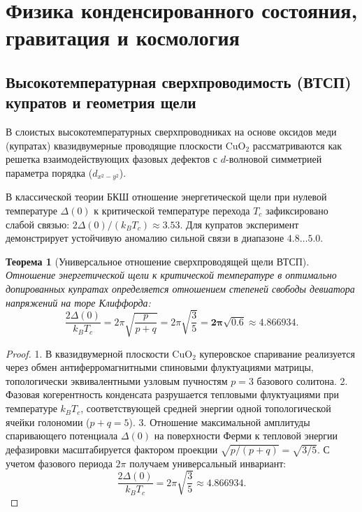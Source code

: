 \documentclass[11pt,a4paper]{article}
\newtheorem{theorem}{Теорема}[section]
\theoremstyle{definition}
\theoremstyle{remark}
\begin{document}

\section{Физика конденсированного состояния, гравитация и космология}
\label{sec:condensed_cosmo}

\subsection{Высокотемпературная сверхпроводимость (ВТСП) купратов и геометрия щели}
В слоистых высокотемпературных сверхпроводниках на основе оксидов меди (купратах) квазидвумерные проводящие плоскости $\mathrm{CuO}_2$ рассматриваются как решетка взаимодействующих фазовых дефектов с $d$-волновой симметрией параметра порядка ($d_{x^2 - y^2}$).

В классической теории БКШ отношение энергетической щели при нулевой температуре $\Delta(0)$ к критической температуре перехода $T_c$ зафиксировано слабой связью: $2\Delta(0)/(k_B T_c) \approx 3.53$. Для купратов эксперимент демонстрирует устойчивую аномалию сильной связи в диапазоне $4.8\dots 5.0$.

\begin{theorem}[Универсальное отношение сверхпроводящей щели ВТСП]
Отношение энергетической щели к критической температуре в оптимально допированных купратах определяется отношением степеней свободы девиатора напряжений на торе Клиффорда:
\begin{equation}
    \frac{2\Delta(0)}{k_B T_c} = 2\pi \sqrt{\frac{p}{p+q}} = 2\pi \sqrt{\frac{3}{5}} = \boldsymbol{2\pi \sqrt{0.6}} \approx \mathbf{4.866934}.
    \label{eq:htsc_ratio_exact}
\end{equation}
\end{theorem}

\begin{proof}
1. В квазидвумерной плоскости $\mathrm{CuO}_2$ куперовское спаривание реализуется через обмен антиферромагнитными спиновыми флуктуациями матрицы, топологически эквивалентными узловым пучностям $p=3$ базового солитона.
2. Фазовая когерентность конденсата разрушается тепловыми флуктуациями при температуре $k_B T_c$, соответствующей средней энергии одной топологической ячейки голономии ($p+q=5$).
3. Отношение максимальной амплитуды спаривающего потенциала $\Delta(0)$ на поверхности Ферми к тепловой энергии дефазировки масштабируется фактором проекции $\sqrt{p/(p+q)} = \sqrt{3/5}$. С учетом фазового периода $2\pi$ получаем универсальный инвариант:
\begin{equation}
    \frac{2\Delta(0)}{k_B T_c} = 2\pi \sqrt{\frac{3}{5}} \approx 4.866934.
\end{equation}
\end{proof}
\end{document}
